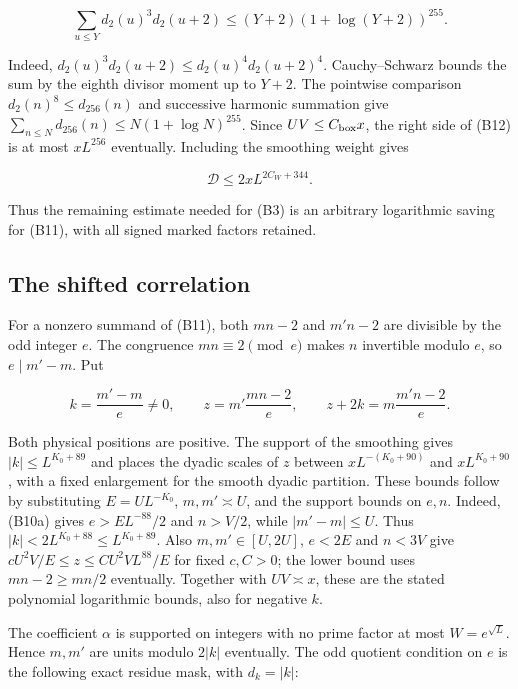\[
\sum_{u\le Y}d_2(u)^3d_2(u+2)
 \le(Y+2)(1+\log(Y+2))^{255}. \tag{B12}
\]

Indeed, \(d_2(u)^3d_2(u+2)\le d_2(u)^4d_2(u+2)^4\). Cauchy--Schwarz
bounds the sum by the eighth divisor moment up to \(Y+2\). The pointwise
comparison \(d_2(n)^8\le d_{256}(n)\) and successive harmonic summation
give \(\sum_{n\le N}d_{256}(n)\le N(1+\log N)^{255}\). Since
\(UV\le C_{\rm box}x\), the right side of (B12) is at most \(xL^{256}\)
eventually. Including the smoothing weight gives

\[
\mathcal D\le2xL^{2C_W+344}. \tag{B13}
\]

Thus the remaining estimate needed for (B3) is an arbitrary logarithmic
saving for (B11), with all signed marked factors retained.


\hypertarget{bilinear-the-shifted-correlation}{%
\subsection{The shifted
correlation}\label{bilinear-the-shifted-correlation}}

For a nonzero summand of (B11), both \(mn-2\) and \(m'n-2\) are
divisible by the odd integer \(e\). The congruence \(mn\equiv2\pmod e\)
makes \(n\) invertible modulo \(e\), so \(e\mid m'-m\). Put

\[
k=\frac{m'-m}{e}\ne0,\qquad
z=m'\frac{mn-2}{e},\qquad
z+2k=m\frac{m'n-2}{e}. \tag{B14}
\]

Both physical positions are positive. The support of the smoothing gives
\(|k|\le L^{K_0+89}\) and places the dyadic scales of \(z\) between
\(xL^{-(K_0+90)}\) and \(xL^{K_0+90}\), with a fixed enlargement for the
smooth dyadic partition. These bounds follow by substituting
\(E=UL^{-K_0}\), \(m,m'\asymp U\), and the support bounds on \(e,n\).
Indeed, (B10a) gives \(e>EL^{-88}/2\) and \(n>V/2\), while
\(|m'-m|\le U\). Thus \(|k|<2L^{K_0+88}\le L^{K_0+89}\). Also
\(m,m'\in[U,2U]\), \(e<2E\) and \(n<3V\) give
\(cU^2V/E\le z\le CU^2VL^{88}/E\) for fixed \(c,C>0\); the lower bound
uses \(mn-2\ge mn/2\) eventually. Together with \(UV\asymp x\), these
are the stated polynomial logarithmic bounds, also for negative \(k\).

The coefficient \(\alpha\) is supported on integers with no prime factor
at most \(W=e^{\sqrt L}\). Hence \(m,m'\) are units modulo \(2|k|\)
eventually. The odd quotient condition on \(e\) is the following exact
residue mask, with \(d_k=|k|\):


